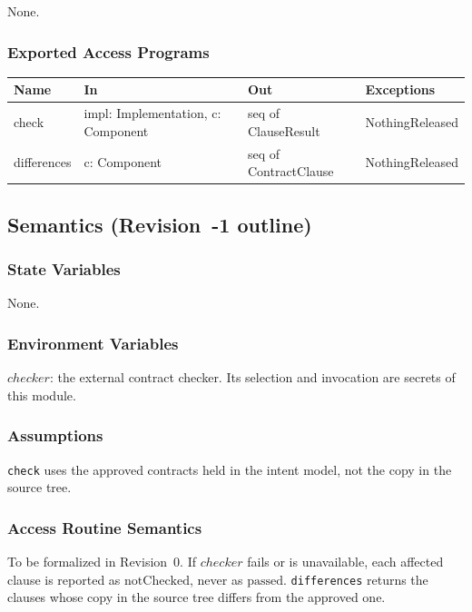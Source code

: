 \documentclass[12pt, titlepage]{article}
\begin{document}
None.

\subsubsection{Exported Access Programs}

\begin{center}
\small
\begin{tabular}{>{\raggedright\arraybackslash}p{3.7cm} >{\raggedright\arraybackslash}p{3.8cm} >{\raggedright\arraybackslash}p{3.6cm} >{\raggedright\arraybackslash}p{3.7cm}}
\hline
\textbf{Name} & \textbf{In} & \textbf{Out} & \textbf{Exceptions} \\
\hline
check & impl: Implementation, c: Component & seq of ClauseResult & NothingReleased \\
differences & c: Component & seq of ContractClause & NothingReleased \\
\hline
\end{tabular}
\end{center}

\subsection{Semantics (Revision~-1 outline)}

\subsubsection{State Variables}

None.

\subsubsection{Environment Variables}

$checker$: the external contract checker. Its selection and invocation are
secrets of this module.

\subsubsection{Assumptions}

\texttt{check} uses the approved contracts held in the intent model, not the
copy in the source tree.

\subsubsection{Access Routine Semantics}

To be formalized in Revision~0. If $checker$ fails or is unavailable, each
affected clause is reported as $\mathrm{notChecked}$, never as
$\mathrm{passed}$. \texttt{differences} returns the clauses whose copy in the
source tree differs from the approved one.
\end{document}
